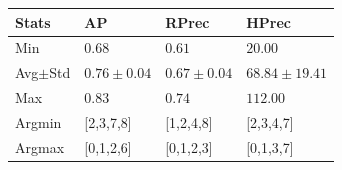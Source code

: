 \begin{table}
  \vspace{0.5cm}

  \begin{tabular}{l l l l}
    \toprule
    Stats
    & AP
    & RPrec
    & HPrec \\
    \midrule
    Min & $0.68$ & $0.61$ & $20.00$ \\
    Avg$\pm$Std & $0.76\pm0.04$ & $0.67\pm0.04$ & $68.84\pm19.41$ \\
    Max & $0.83$ & $0.74$ & $112.00$ \\
    Argmin & [2,3,7,8] & [1,2,4,8] & [2,3,4,7] \\
    Argmax & [0,1,2,6] & [0,1,2,3] & [0,1,3,7] \\
    \bottomrule
  \end{tabular}
\end{table}

